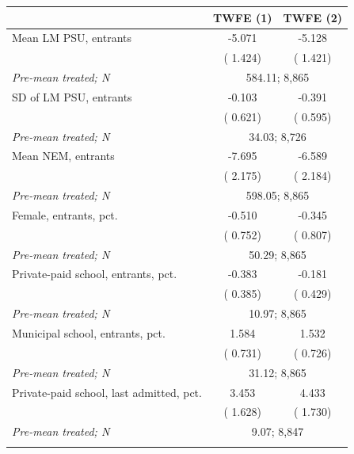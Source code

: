\begin{tabular}{lcc}
\toprule
 & TWFE (1) & TWFE (2) \\
\midrule
Mean LM PSU, entrants &  -5.071\sym{***} &  -5.128\sym{***} \\
 & ( 1.424) & ( 1.421) \\
\quad \textit{Pre-mean treated; N} & \multicolumn{2}{c}{\scriptsize 584.11; 8,865} \\
\addlinespace
SD of LM PSU, entrants &  -0.103 &  -0.391 \\
 & ( 0.621) & ( 0.595) \\
\quad \textit{Pre-mean treated; N} & \multicolumn{2}{c}{\scriptsize  34.03; 8,726} \\
\addlinespace
Mean NEM, entrants &  -7.695\sym{***} &  -6.589\sym{***} \\
 & ( 2.175) & ( 2.184) \\
\quad \textit{Pre-mean treated; N} & \multicolumn{2}{c}{\scriptsize 598.05; 8,865} \\
\addlinespace
Female, entrants, pct. &  -0.510 &  -0.345 \\
 & ( 0.752) & ( 0.807) \\
\quad \textit{Pre-mean treated; N} & \multicolumn{2}{c}{\scriptsize  50.29; 8,865} \\
\addlinespace
Private-paid school, entrants, pct. &  -0.383 &  -0.181 \\
 & ( 0.385) & ( 0.429) \\
\quad \textit{Pre-mean treated; N} & \multicolumn{2}{c}{\scriptsize  10.97; 8,865} \\
\addlinespace
Municipal school, entrants, pct. &   1.584\sym{**} &   1.532\sym{**} \\
 & ( 0.731) & ( 0.726) \\
\quad \textit{Pre-mean treated; N} & \multicolumn{2}{c}{\scriptsize  31.12; 8,865} \\
\addlinespace
Private-paid school, last admitted, pct. &   3.453\sym{**} &   4.433\sym{**} \\
 & ( 1.628) & ( 1.730) \\
\quad \textit{Pre-mean treated; N} & \multicolumn{2}{c}{\scriptsize   9.07; 8,847} \\
\addlinespace
\bottomrule
\end{tabular}
